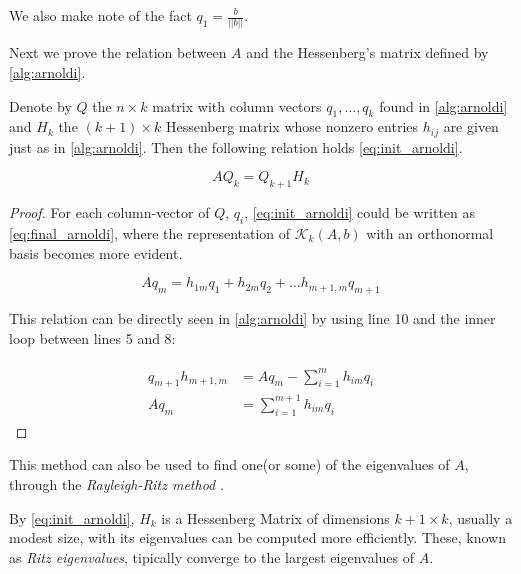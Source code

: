 We also make note of the fact $q_{1} = \frac{b}{||b||}$.

Next we prove the relation between $A$ and the Hessenberg's matrix defined by \ref{alg:arnoldi}.

\begin{proposition}

    Denote by $Q$ the $n \times k$ matrix with column vectors $q_{1}, \dots, q_{k}$ found in \ref{alg:arnoldi} and $H_{k}$ the $(k + 1)\times k$ Hessenberg matrix whose nonzero entries $h_{ij}$ are given just as in \ref{alg:arnoldi}. Then the following relation holds \ref{eq:init_arnoldi}.

    \begin{equation} \label{eq:init_arnoldi}
        AQ_{k} = Q_{k+1}H_{k}
    \end{equation}
\end{proposition}

\begin{proof}
    For each column-vector of $Q$, $q_{i}$, \ref{eq:init_arnoldi} could be written as \ref{eq:final_arnoldi}, where the representation of $\mathcal{K}_{k}(A,b)$ with an orthonormal basis becomes more evident.

    \begin{equation}\label{eq:final_arnoldi}
        Aq_{m} = h_{1m}q_{1} + h_{2m}q_{2} + \dots h_{m+1,m}q_{m+1}
    \end{equation}

    This relation can be directly seen in \ref{alg:arnoldi} by using line 10 and the inner loop between lines 5 and 8:

    \begin{align}
        \begin{split}
            q_{m+1}h_{m+1,m} & = Aq_{m} - \sum_{i=1}^{m} h_{im}q_{i}\\
            Aq_{m} & = \sum_{i=1}^{m+1} h_{im}q_{i}
        \end{split}
    \end{align}

\end{proof}

This method can also be used to find one(or some) of the eigenvalues of $A$, through the \textit{Rayleigh-Ritz method} \cite{trefethen1998numerical}.

By \ref{eq:init_arnoldi}, $H_{k}$ is a Hessenberg Matrix of dimensions $k+1 \times k$, usually a modest size, with its eigenvalues can be computed more efficiently. These, known as \textit{Ritz eigenvalues}, tipically converge to the largest eigenvalues of $A$.
